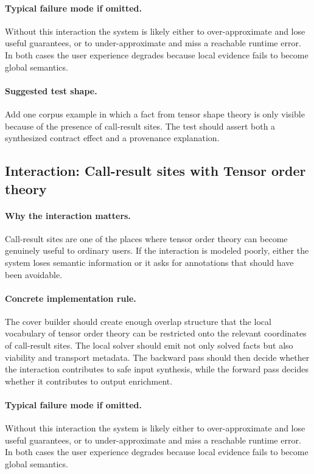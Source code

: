\documentclass[11pt]{report}
\theoremstyle{definition}
\theoremstyle{plain}
\begin{document}
\paragraph{Typical failure mode if omitted.}
Without this interaction the system is likely either to over-approximate and
lose useful guarantees, or to under-approximate and miss a reachable runtime
error. In both cases the user experience degrades because local evidence
fails to become global semantics.

\paragraph{Suggested test shape.}
Add one corpus example in which a fact from tensor shape theory is only
visible because of the presence of call-result sites. The test should
assert both a synthesized contract effect and a provenance explanation.

\subsection{Interaction: Call-result sites with Tensor order theory}

\paragraph{Why the interaction matters.}
Call-result sites are one of the places where tensor order theory can become
genuinely useful to ordinary users. If the interaction is modeled poorly,
either the system loses semantic information or it asks for annotations that
should have been avoidable.

\paragraph{Concrete implementation rule.}
The cover builder should create enough overlap structure that the local
vocabulary of tensor order theory can be restricted onto the relevant
coordinates of call-result sites. The local solver should emit not only
solved facts but also viability and transport metadata. The backward pass
should then decide whether the interaction contributes to safe input
synthesis, while the forward pass decides whether it contributes to output
enrichment.

\paragraph{Typical failure mode if omitted.}
Without this interaction the system is likely either to over-approximate and
lose useful guarantees, or to under-approximate and miss a reachable runtime
error. In both cases the user experience degrades because local evidence
fails to become global semantics.
\end{document}
